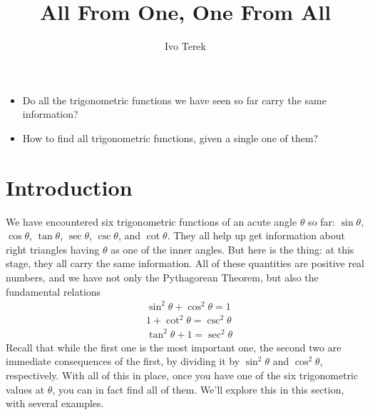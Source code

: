 \documentclass{ximera}
\author{Ivo Terek}
\title{All From One, One From All}
\begin{document}
\begin{abstract}
  
\end{abstract}
\maketitle



\begin{motivatingQuestions}\begin{itemize}
\item Do all the trigonometric functions we have seen so far carry the same information?
\item How to find all trigonometric functions, given a single one of them?
\end{itemize}\end{motivatingQuestions}



\section{Introduction}

We have encountered six trigonometric functions of an acute angle $\theta$ so far: $\sin\theta$, $\cos\theta$, $\tan\theta$, $\sec \theta$, $\csc \theta$, and $\cot\theta$. They all help up get information about right triangles having $\theta$ as one of the inner angles. But here is the thing: at this stage, they all carry the same information. All of these quantities are positive real numbers, and we have not only the Pythagorean Theorem, but also the fundamental relations
\begin{align*}
  &\sin^2\theta + \cos^2\theta =1 \\ &1+\cot^2\theta = \csc^2\theta \\ &\tan^2\theta + 1 = \sec^2\theta
\end{align*}
Recall that while the first one is the most important one, the second two are immediate consequences of the first, by dividing it by $\sin^2\theta$ and $\cos^2\theta$, respectively. With all of this in place, once you have one of the six trigonometric values at $\theta$, you can in fact find all of them. We'll explore this in this section, with several examples.
\end{document}
